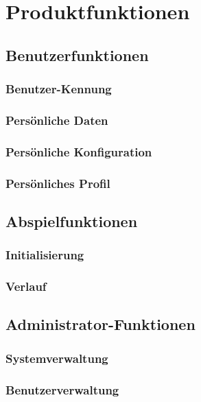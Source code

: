 \chapter{Produktfunktionen}
\section{Benutzerfunktionen}
\subsection{Benutzer-Kennung}
\subsection{Persönliche Daten}
\subsection{Persönliche Konfiguration}
\subsection{Persönliches Profil}
\section{Abspielfunktionen}
\subsection{Initialisierung}
\subsection{Verlauf}
\section{Administrator-Funktionen}
\subsection{Systemverwaltung}
\subsection{Benutzerverwaltung}